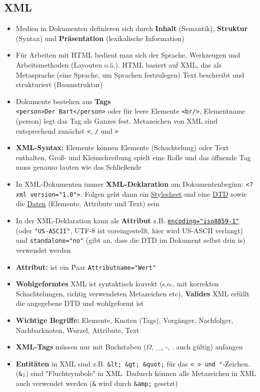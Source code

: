 \documentclass[12pt,landscape]{article}
\def\code#1{\texttt{#1}} %
\begin{document}
\begin{multicols}{3}
\section{XML}
\begin{itemize}
\item Medien in Dokumenten definieren sich durch \textbf{Inhalt} (Semantik), \textbf{Struktur} (Syntax) und \textbf{Präsentation} (lexikalische Information)
\item Für Arbeiten mit HTML bedient man sich der Sprache, Werkzeugen und Arbeitsmethoden (Layouten o.ä.). HTML basiert auf XML, das als Metasprache (eine Sprache, um Sprachen festzulegen) Text beschreibt und strukturiert (Baumstruktur)
\item Dokumente bestehen aus \textbf{Tags}\\
\lstinline|<person>Der Bart</person>| oder für leere Elemente \lstinline|<br/>|, Elementname (person) legt das Tag als Ganzes fest. Metazeichen von XML sind entsprechend zunächst \code{<}, \code{/} und \code{>}
\item \textbf{XML-Syntax:} Elemente können Elemente (Schachtelung) oder Text enthalten, Groß- und Kleinschreibung spielt eine Rolle und das öffnende Tag muss genauso lauten wie das Schließende
\item In XML-Dokumenten immer \textbf{XML-Deklaration} am Dokumentenbeginn: \lstinline|<?xml version="1.0">|. Folgen geht dann ein \underline{Stylesheet} und eine \underline{DTD} sowie die \underline{Daten} (Elemente, Attribute und Text) sein
\item In der XML-Deklaration kann als \textbf{Attribut} z.B. \hyperlink{latin}{\lstinline|encoding="iso8859-1"|} (oder \lstinline|"US-ASCII"|, UTF-8 ist voreingestellt, hier wird US-ASCII verlangt) und \lstinline|standalone="no"| (gibt an, dass die DTD im Dokument selbst drin is) verwendet werden
\item \textbf{Attribut:} ist ein Paar \lstinline|Attributname="Wert"|
\item \textbf{Wohlgeformtes} XML ist syntaktisch korrekt (s.o., mit korrekten Schachtelungen, richtig verwendeten Metazeichen etc), \textbf{Valides} XML erfüllt die angegebene DTD und wohlgeformt ist
\item \textbf{Wichtige Begriffe:} Elemente, Knoten (Tags), Vorgänger, Nachfolger, Nachbarknoten, Wurzel, Attribute, Text
\item \textbf{XML-Tags} müssen nur mit Buchstaben ($\Omega$, \_, -, . auch gültig) anfangen
\item \textbf{Entitäten} in XML sind z.B. \lstinline|&lt; &gt; &quot;| für das \code{< > und "}-Zeichen. (\lstinline|&;|) sind "Fluchtsymbole" in XML. Dadurch können alle Metazeichen in XML auch verwendet werden (\lstinline|&| wird durch \lstinline|&amp;| gesetzt)

\end{itemize}
\end{multicols}
\end{document}
